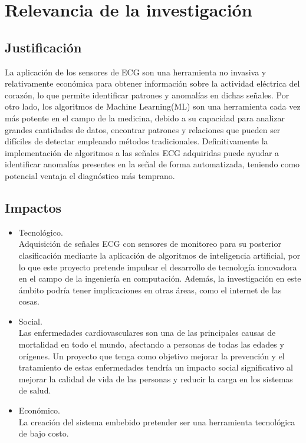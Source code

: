 \section{Relevancia de la investigación}
\label{sec:significance}

\subsection{Justificación}
La aplicación de los sensores de ECG  son una herramienta no invasiva y relativamente económica para obtener información sobre la actividad eléctrica del corazón, lo que permite identificar patrones y anomalías en dichas señales.
Por otro lado, los algoritmos de Machine Learning(ML) son una herramienta cada vez más potente en el campo de la medicina, debido a su capacidad para analizar grandes cantidades de datos, encontrar patrones y relaciones que pueden ser difíciles de detectar empleando métodos tradicionales.  
Definitivamente la implementación de algoritmos a las señales ECG adquiridas puede ayudar a identificar anomalías presentes en la señal de forma automatizada, teniendo como potencial ventaja el diagnóstico más temprano.

\subsection{Impactos}

\begin{itemize}
	\item Tecnológico.\\
	Adquisición de señales ECG con sensores de monitoreo para su posterior clasificación mediante la aplicación de algoritmos de inteligencia artificial, por lo que este proyecto pretende impulsar el desarrollo de tecnología innovadora en el campo de la ingeniería en computación. 
	Además, la investigación en este ámbito podría tener implicaciones en otras áreas, como el internet de las cosas.
	\item Social.\\
	Las enfermedades cardiovasculares son una de las principales causas de mortalidad en todo el mundo, afectando a personas de todas las edades y orígenes.
	Un proyecto que tenga como objetivo mejorar la prevención y el tratamiento de estas enfermedades tendría un impacto social significativo al mejorar la calidad de vida de las personas y reducir la carga en los sistemas de salud.
	\item Económico.\\
	La creación del sistema embebido pretender ser una herramienta tecnológica de bajo costo.
\end{itemize}
